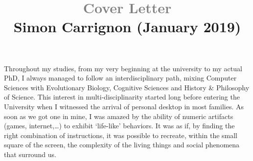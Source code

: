 \documentclass[10pt]{article}
\title{\textcolor{grey}{\Large Cover Letter}\\
\vspace{-.25cm}
{ \normalsize Simon Carrignon (January 2019)}}
\author{}
\date{}
\begin{document}
\maketitle

\vspace{-.5cm}

Throughout my studies, from my very beginning at the university to my actual PhD, I always managed to follow an interdisciplinary path, mixing Computer Sciences with Evolutionary Biology, Cognitive Sciences and History \& Philosophy of Science. This interest in multi-disciplinarity started long before entering the University when I witnessed the arrival of personal desktop in most families. As soon as we got one in mine, I was amazed by the ability of numeric artifacts (games, internet,\ldots) to exhibit ‘life-like’ behaviors. 
It was as if, by finding the right combination of instructions, it was possible to recreate, within the small square of the screen, the complexity of the living things and social phenomena that surround us.
\end{document}
